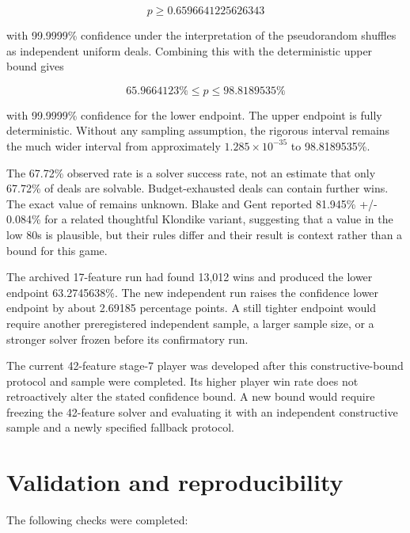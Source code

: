 \documentclass[11pt]{article}
\begin{document}
\[
p\ge 0.6596641225626343
\]

with 99.9999\% confidence under the interpretation of the pseudorandom shuffles as independent uniform deals. Combining this with the deterministic upper bound gives

\[
65.9664123\%\le p\le 98.8189535\%
\]

with 99.9999\% confidence for the lower endpoint. The upper endpoint is fully deterministic. Without any sampling assumption, the rigorous interval remains the much wider interval from approximately $1.285\times10^{-35}$ to 98.8189535\%.

The 67.72\% observed rate is a solver success rate, not an estimate that only 67.72\% of deals are solvable. Budget-exhausted deals can contain further wins. The exact value of \texttt{} remains unknown. Blake and Gent reported 81.945\% +/- 0.084\% for a related thoughtful Klondike variant, suggesting that a value in the low 80s is plausible, but their rules differ and their result is context rather than a bound for this game.

The archived 17-feature run had found 13,012 wins and produced the lower endpoint 63.2745638\%. The new independent run raises the confidence lower endpoint by about 2.69185 percentage points. A still tighter endpoint would require another preregistered independent sample, a larger sample size, or a stronger solver frozen before its confirmatory run.

The current 42-feature stage-7 player was developed after this constructive-bound protocol and sample were completed. Its higher player win rate does not retroactively alter the stated confidence bound. A new bound would require freezing the 42-feature solver and evaluating it with an independent constructive sample and a newly specified fallback protocol.

\section{Validation and reproducibility}

The following checks were completed:
\end{document}

